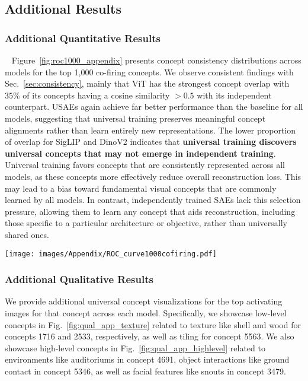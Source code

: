 \subsection{Additional Results}

\subsubsection{Additional Quantitative Results}~\label{sec:appendix_quant}
Figure~\ref{fig:roc1000_appendix} presents concept consistency distributions across models for the top 1,000 co-firing concepts. We observe consistent findings with Sec.~\ref{sec:consistency}, mainly that ViT has the strongest concept overlap with $35\%$ of its concepts having a cosine similarity $>0.5$ with its independent counterpart. USAEs again achieve far better performance than the baseline for all models, suggesting that universal training preserves meaningful concept alignments rather than learn entirely new representations. The lower proportion of overlap for SigLIP and DinoV2 indicates that \textbf{universal training discovers universal concepts that may not emerge in independent training}. Universal training favors concepts that are consistently represented across all models, as these concepts more effectively reduce overall reconstruction loss. This may lead to a bias toward fundamental visual concepts that are commonly learned by all models. In contrast, independently trained SAEs lack this selection pressure, allowing them to learn any concept that aids reconstruction, including those specific to a particular architecture or objective, rather than universally shared ones.

\begin{figure*}[t]
    \centering
    \texttt{[image: images/Appendix/ROC\_curve1000cofiring.pdf]}
    \caption{\textbf{Top 1000 co-firing concept consistency between independent SAEs and Universal SAEs.} Our universal training objective discovers universal concepts that have overlap (i.e., cosine similarity) with those discovered with independent training. ViT again has noticeably more overlap, suggesting its simpler architecture and training objective may yield activations that naturally encode fundamental and universal visual concepts.}
    \label{fig:roc1000_appendix}
\end{figure*}




\subsubsection{Additional Qualitative Results}
We provide additional universal concept visualizations for the top activating images for that concept across each model. Specifically, we showcase low-level concepts in Fig.~\ref{fig:qual_app_texture} related to texture like shell and wood for concepts 1716 and 2533, respectively, as well as tiling for concept 5563. We also showcase high-level concepts in Fig.~\ref{fig:qual_app_highlevel} related to environments like auditoriums in concept 4691, object interactions like ground contact in concept 5346, as well as facial features like snouts in concept 3479. 


